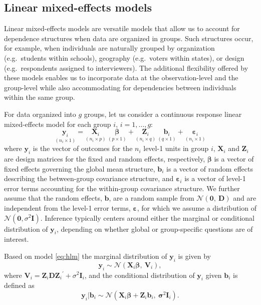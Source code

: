 \documentclass[12pt]{article} %
\newcommand{\trans}{\ensuremath{^\prime}}
\begin{document}
\subsection{Linear mixed-effects models} 

Linear mixed-effects models are versatile models that allow us to account for dependence structures when data are organized in groups.
Such structures occur, for example, when individuals are naturally grouped by organization (e.g.~students within schools), geography (e.g.~voters within states), or design (e.g.~respondents assigned to  interviewers). The additional flexibility offered by these models enables us to incorporate data at the observation-level and the group-level while also accommodating for dependencies between individuals within the same group. 

For data organized into $g$ groups, 
let us  consider a continuous response linear mixed-effects model for each group $i$, $i=1, \ldots, g$:
%
\begin{equation}\label{eq:hlm}
	\underset{(n_i \times 1)}{\bm{y}_i} = \underset{(n_i \times p)}{\bm{X}_i} \ \underset{(p \times 1)}{\bm{\beta}} + \underset{(n_i \times q)}{\bm{Z}_i} \ \underset{(q \times 1)}{\bm{b}_i} + \underset{(n_i \times 1)}{\bm{\varepsilon}_i}
\end{equation}
%
where $\bm{y}_i$ is the vector of outcomes for the $n_i$ level-1 units in group $i$, $\bm{X}_i$ and $\bm{Z}_i$ are design matrices for the fixed and random effects, respectively, $\bm{\beta}$ is a vector of fixed effects governing the global mean structure, $\bm{b}_i$ is a vector of random effects describing the between-group covariance structure, and $\bm{\varepsilon}_i$ is a vector of level-1 error terms accounting for the within-group covariance structure. We further assume that the random effects,  $\bm{b}$,  are a random sample from $\mathcal{N}(\bm{0},\ \bm{D})$ and are independent from the level-1 error terms,  $\bm{\varepsilon}$, for which we assume a distribution of $\mathcal{N}(\bm{0},\sigma^2 \bm{I})$. %
Inference typically centers around either the marginal or conditional distribution of $\bm{y}_i$, depending on whether global or group-specific questions are of interest.

Based on model \eqref{eq:hlm} the marginal distribution of $\bm{y}_i$ is given by
%
\begin{equation}\label{eq:marginalmod}
\bm{y}_i \sim \mathcal{N}\left(\bm{X}_i\bm{\beta},\ \bm{V}_i \right),
\end{equation}
%
where $\bm{V}_i = \bm{Z}_i \bm{DZ}_i\trans + \sigma^2 \bm{I}_i$, and the conditional distribution of $\bm{y}_i$ given $\bm{b}_i$ is defined as
%
\begin{equation}\label{eq:conditionalmod}
\bm{y}_i | \bm{b}_i \sim \mathcal{N}\left(\bm{X}_i\bm{\beta} + \bm{Z}_i \bm{b}_i, \ \bm\sigma^2 \bm{I}_i \right).
\end{equation}
%
\end{document}
